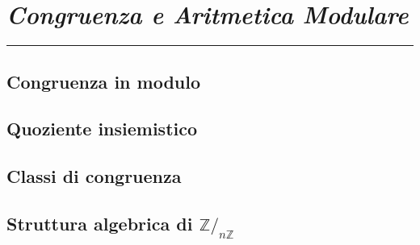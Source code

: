 \documentclass[oneside]{book}
\newcommand{\chptr}[1]{\chapter{\textit{#1}}\noindent\rule{\textwidth}{1pt}}
\theoremstyle{remark}
\begin{document}
\chptr{Congruenza e Aritmetica Modulare}
\section{Congruenza in modulo}
\section{Quoziente insiemistico}
\section{Classi di congruenza}
\section{Struttura algebrica di $\mathbb{Z}/_{n\mathbb{Z}}$}
\end{document}
